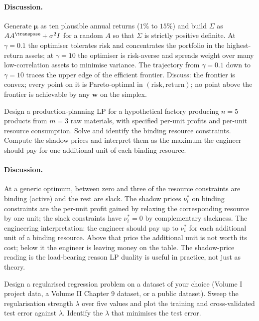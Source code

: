 \paragraph{Discussion.}
Generate $\boldsymbol{\mu}$ as ten plausible annual returns
($1\%$ to $15\%$) and build $\Sigma$ as $A A^{\transpose} +
\sigma^{2} I$ for a random $A$ so that $\Sigma$ is strictly
positive definite. At $\gamma = 0.1$ the optimiser tolerates risk
and concentrates the portfolio in the highest-return assets; at
$\gamma = 10$ the optimiser is risk-averse and spreads weight over
many low-correlation assets to minimise variance. The trajectory
from $\gamma = 0.1$ down to $\gamma = 10$ traces the upper edge of
the efficient frontier. Discuss: the frontier is convex; every
point on it is Pareto-optimal in $(\text{risk}, \text{return})$;
no point above the frontier is achievable by any
$\boldsymbol{w}$ on the simplex.

\begin{exercise}
Design a production-planning LP for a hypothetical factory
producing $n = 5$ products from $m = 3$ raw materials, with
specified per-unit profits and per-unit resource consumption.
Solve and identify the binding resource constraints. Compute the
shadow prices and interpret them as the maximum the engineer
should pay for one additional unit of each binding resource.
\end{exercise}

\paragraph{Discussion.}
At a generic optimum, between zero and three of the resource
constraints are binding (active) and the rest are slack. The
shadow prices $\nu_{i}^{*}$ on binding constraints are the per-unit
profit gained by relaxing the corresponding resource by one unit;
the slack constraints have $\nu_{i}^{*} = 0$ by complementary
slackness. The engineering interpretation: the engineer should pay
up to $\nu_{i}^{*}$ for each additional unit of a binding
resource. Above that price the additional unit is not worth its
cost; below it the engineer is leaving money on the table. The
shadow-price reading is the load-bearing reason LP duality is
useful in practice, not just as theory.

\begin{exercise}
Design a regularised regression problem on a dataset of your
choice (Volume I project data, a Volume II Chapter 9 dataset, or
a public dataset). Sweep the regularisation strength $\lambda$
over five values and plot the training and cross-validated
test error against $\lambda$. Identify the $\lambda$ that
minimises the test error.
\end{exercise}


